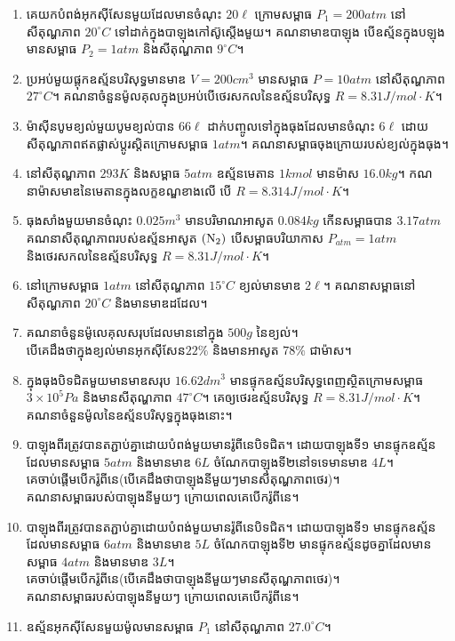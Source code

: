 \begin{enumerate}
	\item គេយកបំពង់អុកស៊ីសែនមួយដែលមានចំណុះ $20\ell$ ក្រោមសម្ពាធ $P_{1}=200atm$ នៅសីតុណ្ហភាព $20^\circ C$ ទៅដាក់ក្នុងបាឡុងកៅស៊ូស្តើងមួយ។ គណនាមាឌបាឡុង បើឧស្ម័នក្នុងបឡុងមានសម្ពាធ $P_{2}=1atm$ និងសីតុណ្ហភាព $9^\circ C$។
	\item ប្រអប់មួយផ្តុកឧស្ម័នបរិសុទ្ធមានមាឌ $V=200cm^{3}$ មានសម្ពាធ $P=10atm$ នៅសីតុណ្ហភាព $27^\circ C$។ គណនាចំនួនម៉ូលគុលក្នុងប្រអប់បើថេរសកលនៃឧស្ម័នបរិសុទ្ធ $R=8.31J/mol\cdot K$។
	\item ម៉ាស៊ីនបូមខ្យល់មួយបូមខ្យល់បាន $66\ell$ ដាក់បញ្ចូលទៅក្នុងធុងដែលមានចំណុះ $6\ell$ ដោយសីតុណ្ហភាពឥតផ្លាស់ប្តូរស្តិតក្រោមសម្ពាធ $1atm$។ គណនាសម្ពាធចុងក្រោយរបស់ខ្យល់ក្នុងធុង។
	\item នៅសីតុណ្ហភាព $293K$ និងសម្ពាធ $5atm$ ឧស្ម័នមេតាន $1kmol$ មានម៉ាស $16.0kg$។ កណនាម៉ាសមាឌនៃមេតានក្នុងលក្ខខណ្ឌខាងលើ បើ $R=8.314J/mol\cdot K$។
	\item ធុងសាំងមួយមានចំណុះ $0.025m^{3}$ មានបរិមាណអាសូត $0.084kg$ កើនសម្ពាធបាន $3.17atm$ គណនាសីតុណ្ហភាពរបស់ឧស្ម័នអាសូត $\left(\ce{N2}\right)$ បើសម្ពាធបរិយាកាស $P_{atm}=1atm$ និងថេរសកលនៃឧស្ម័នបរិសុទ្ធ $R=8.31J/mol\cdot K$។
	\item នៅក្រោមសម្ពាធ $1atm$ នៅសីតុណ្ហភាព $15^\circ C$ ខ្យល់មានមាឌ $2\ell$។ គណនាសម្ពាធនៅសីតុណ្ហភាព $20^\circ C$ និងមានមាឌដដែល។
	\item គណនាចំនួនម៉ូលេគុលសរុបដែលមាននៅក្នុង $500g$ នៃខ្យល់។\\ បើគេដឹងថាក្នុងខ្យល់មានអុកសុីសែន​ $22\%$ និងមានអាសូត $78\%$ ជាម៉ាស។
	\item ក្នុងធុងបិទជិតមួយមានមាឌសរុប $16.62dm^3$ មានផ្ទុកឧស្ម័នបរិសុទ្ធពេញស្ថិតក្រោមសម្ពាធ $3\times10^{5}Pa$ និងមានសីតុណ្ហភាព $47^\circ C$។ គេឲ្យថេរឧស្ម័នបរិសុទ្ធ $R=8.31J/mol\cdot K$។ គណនាចំនួនម៉ូលនៃឧស្ម័នបរិសុទ្ធក្នុងធុងនោះ។
	\item បាឡុងពីរត្រូវបានតភ្ជាប់គ្នាដោយបំពង់មួយមានរ៉ូពីនេបិទជិត។ ដោយបាឡុងទី១ មានផ្ទុកឧស្ម័នដែលមានសម្ពាធ $5atm$ និងមានមាឌ $6L$ ចំណែកបាឡុងទី២នៅទទេមានមាឌ $4L$។\\ គេចាប់ផ្តើមបើករ៉ូពីនេ(បើគេដឹងថាបាឡុងនីមួយៗមានសីតុណ្ហភាពថេរ)។\\ គណនាសម្ពាធរបស់បាឡុងនីមួយៗ ក្រោយពេលគេបើករ៉ូពីនេ។
	\item បាឡុងពីរត្រូវបានតភ្ជាប់គ្នាដោយបំពង់មួយមានរ៉ូពីនេបិទជិត។ ដោយបាឡុងទី១ មានផ្ទុកឧស្ម័នដែលមានសម្ពាធ $6atm$ និងមានមាឌ $5L$ ចំណែកបាឡុងទី២ មានផ្ទុកឧស្ម័នដូចគ្នាដែលមានសម្ពាធ $4atm$ និងមានមាឌ $3L$។\\ គេចាប់ផ្តើមបើករ៉ូពីនេ(បើគេដឹងថាបាឡុងនីមួយៗមានសីតុណ្ហភាពថេរ)។\\ គណនាសម្ពាធរបស់បាឡុងនីមួយៗ ក្រោយពេលគេបើករ៉ូពីនេ។
	\item ឧស្ម័នអុកសុីសែនមួយម៉ូលមានសម្ពាធ $P_{1}$ នៅសីតុណ្ហភាព $27.0^\circ C$។

\end{enumerate}
